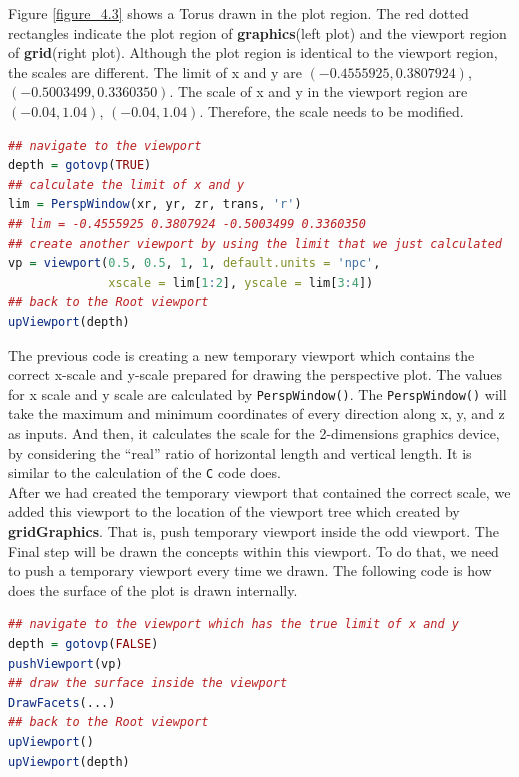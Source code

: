 \documentclass[11pt,twoside]{report}
\begin{document}
Figure \ref{figure_4.3} shows a Torus drawn in the plot region. The red dotted rectangles indicate the plot region of \textbf{graphics}(left plot) and the viewport region of \textbf{grid}(right plot). Although the plot region is identical to the viewport region, the scales are different. The limit of x and y are $(-0.4555925,  0.3807924)$, $(-0.5003499,  0.3360350)$. The scale of x and y in the viewport region are $(-0.04,  1.04)$, $(-0.04,  1.04)$. Therefore, the scale needs to be modified. \\

\newpage
\begin{lstlisting}[language = R]
## navigate to the viewport
depth = gotovp(TRUE) 
## calculate the limit of x and y
lim = PerspWindow(xr, yr, zr, trans, 'r')
## lim = -0.4555925 0.3807924 -0.5003499 0.3360350
## create another viewport by using the limit that we just calculated
vp = viewport(0.5, 0.5, 1, 1, default.units = 'npc',
              xscale = lim[1:2], yscale = lim[3:4]) 
## back to the Root viewport
upViewport(depth)  
\end{lstlisting}
The previous code is creating a new temporary viewport which contains the correct x-scale and y-scale prepared for drawing the perspective plot. The values for x scale and y scale are calculated by \texttt{PerspWindow()}. The \texttt{PerspWindow()} will take the maximum and minimum coordinates of every direction along x, y, and z as inputs. And then, it calculates the scale for the 2-dimensions graphics device, by considering the ``real'' ratio of horizontal length and vertical length. It is similar to the calculation of the \texttt{C} code does.\\

After we had created the temporary viewport that contained the correct scale, we added this viewport to the location of the viewport tree which created by \textbf{gridGraphics}. That is, push temporary viewport inside the odd viewport. The Final step will be drawn the concepts within this viewport. To do that, we need to push a temporary viewport every time we drawn. The following code is how does the surface of the plot is drawn internally.

\begin{lstlisting}[language = R]
## navigate to the viewport which has the true limit of x and y
depth = gotovp(FALSE)
pushViewport(vp)
## draw the surface inside the viewport
DrawFacets(...)
## back to the Root viewport
upViewport()
upViewport(depth)
\end{lstlisting}
\end{document}
